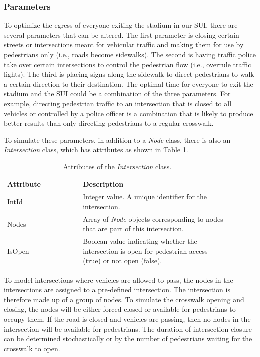 \documentclass[12pt]{article}
\begin{document}
\subsubsection{Parameters}

To optimize the egress of everyone exiting the stadium in our SUI, there are
several parameters that can be altered. The first parameter is closing certain
streets or intersections meant for vehicular traffic and making them for use by
pedestrians only (i.e.,
roads become sidewalks). The second is having traffic police take over certain
intersections to control the pedestrian flow (i.e., overrule traffic lights).
The third is placing signs along the sidewalk to direct pedestrians to walk a
certain direction to their destination. The optimal time for everyone to exit
the stadium and the SUI could be a combination of the three parameters.
For example, directing pedestrian traffic to an intersection that is closed to
all vehicles or controlled by a police officer is a combination that is likely
to produce better results than only directing pedestrians to a regular
crosswalk.

To simulate these parameters, in addition to a \textit{Node} class, there is
also an \textit{Intersection} class, which has attributes as shown in Table
\ref{table:intersection}.

\def\arraystretch{1.5}
\begin{table}[hb!]
  \centering
    \begin{tabular}{p{0.3\linewidth}p{0.6\linewidth}}
     \hline
     Attribute & Description \\
     \hline
     IntId & Integer value. A unique identifier for the intersection. \\
     Nodes & Array of \textit{Node} objects corresponding to nodes
             that are part of this intersection. \\
     IsOpen  & Boolean value indicating whether the intersection is open
             for pedestrian access (true) or not open (false). \\
     \hline
    \end{tabular}
    \caption{Attributes of the \textit{Intersection} class.}
  \label{table:intersection}
\end{table}

To model intersections where vehicles are allowed to pass, the nodes in the
intersections are assigned to a pre-defined intersection. The intersection
is therefore made up of a group of nodes. To simulate the crosswalk opening and
closing, the nodes will be either forced closed or available for pedestrians to
occupy them. If the road is closed and vehicles are passing, then no nodes in
the intersection will be available for pedestrians. The duration of
intersection closure can be determined stochastically or by the number of
pedestrians waiting for the crosswalk to open.
\end{document}
